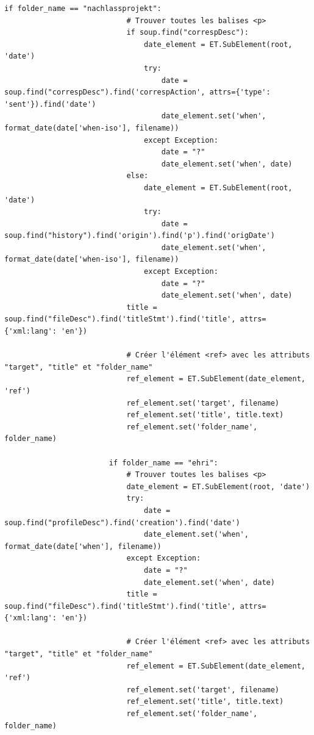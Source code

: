 \begin{lstlisting}[style=pythonStyle, caption=script python pour générer les timeline.xml]
                        if folder_name == "nachlassprojekt":
                            # Trouver toutes les balises <p>
                            if soup.find("correspDesc"):
                                date_element = ET.SubElement(root, 'date')
                                try:
                                    date = soup.find("correspDesc").find('correspAction', attrs={'type': 'sent'}).find('date')
                                    date_element.set('when', format_date(date['when-iso'], filename))
                                except Exception:
                                    date = "?"
                                    date_element.set('when', date)
                            else:
                                date_element = ET.SubElement(root, 'date')
                                try:
                                    date = soup.find("history").find('origin').find('p').find('origDate')
                                    date_element.set('when', format_date(date['when-iso'], filename))
                                except Exception:
                                    date = "?"
                                    date_element.set('when', date)
                            title = soup.find("fileDesc").find('titleStmt').find('title', attrs={'xml:lang': 'en'})

                            # Créer l'élément <ref> avec les attributs "target", "title" et "folder_name"
                            ref_element = ET.SubElement(date_element, 'ref')
                            ref_element.set('target', filename)
                            ref_element.set('title', title.text)
                            ref_element.set('folder_name', folder_name)

                        if folder_name == "ehri":
                            # Trouver toutes les balises <p>
                            date_element = ET.SubElement(root, 'date')
                            try:
                                date = soup.find("profileDesc").find('creation').find('date')
                                date_element.set('when', format_date(date['when'], filename))
                            except Exception:
                                date = "?"
                                date_element.set('when', date)
                            title = soup.find("fileDesc").find('titleStmt').find('title', attrs={'xml:lang': 'en'})

                            # Créer l'élément <ref> avec les attributs "target", "title" et "folder_name"
                            ref_element = ET.SubElement(date_element, 'ref')
                            ref_element.set('target', filename)
                            ref_element.set('title', title.text)
                            ref_element.set('folder_name', folder_name)


\end{lstlisting}
